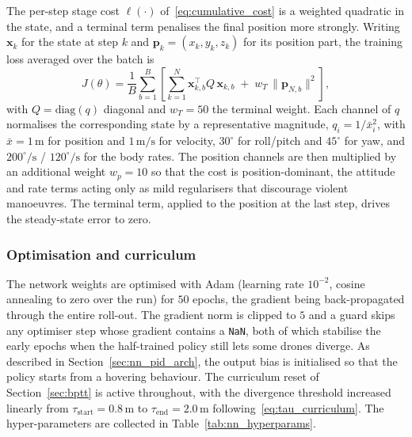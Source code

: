 \documentclass[11pt,a4paper]{article}
\theoremstyle{remark}
\numberwithin{equation}{section}
\begin{document}
The per-step stage cost $\ell(\cdot)$ of~\eqref{eq:cumulative_cost} is a weighted
quadratic in the state, and a terminal term penalises the final position more
strongly. Writing $\mathbf{x}_k$ for the state at step $k$ and
$\mathbf{p}_k = (x_k, y_k, z_k)$ for its position part, the training loss
averaged over the batch is
\begin{equation}
J(\theta) = \frac{1}{B}\sum_{b=1}^{B}\left[
\sum_{k=1}^{N} \mathbf{x}_{k,b}^\top Q\, \mathbf{x}_{k,b}
\;+\; w_T \,\big\|\mathbf{p}_{N,b}\big\|^2 \right],
\label{eq:reg_cost}
\end{equation}
with $Q = \mathrm{diag}(q)$ diagonal and $w_T = 50$ the terminal weight. Each
channel of $q$ normalises the corresponding state by a representative magnitude,
$q_i = 1/\bar{x}_i^2$, with $\bar{x} = 1\,\mathrm{m}$ for position and
$1\,\mathrm{m/s}$ for velocity, $30^\circ$ for roll/pitch and $45^\circ$ for yaw,
and $200^\circ/\mathrm{s}$ / $120^\circ/\mathrm{s}$ for the body rates. The
position channels are then multiplied by an additional weight $w_p = 10$ so that
the cost is position-dominant, the attitude and rate terms acting only as mild
regularisers that discourage violent manoeuvres. The terminal term, applied to
the position at the last step, drives the steady-state error to zero.

\subsubsection*{Optimisation and curriculum}

The network weights are optimised with Adam (learning rate $10^{-2}$, cosine
annealing to zero over the run) for $50$ epochs, the gradient being back-propagated
through the entire roll-out. The gradient norm is clipped to $5$ and a guard
skips any optimiser step whose gradient contains a \texttt{NaN}, both of which
stabilise the early epochs when the half-trained policy still lets some drones
diverge. As described in Section~\ref{sec:nn_pid_arch}, the output bias is
initialised so that the policy starts from a hovering behaviour. The curriculum
reset of Section~\ref{sec:bptt} is active throughout, with the divergence
threshold increased linearly from $\tau_{\mathrm{start}} = 0.8\,\mathrm{m}$ to
$\tau_{\mathrm{end}} = 2.0\,\mathrm{m}$ following~\eqref{eq:tau_curriculum}. The
hyper-parameters are collected in Table~\ref{tab:nn_hyperparams}.
\end{document}

